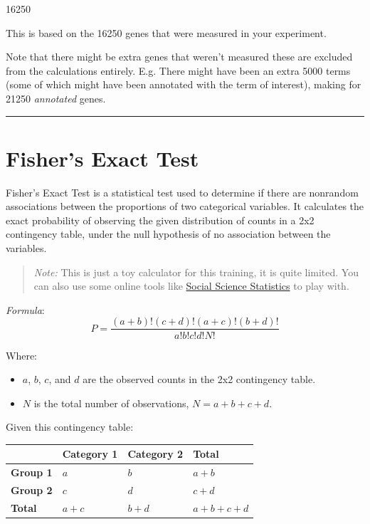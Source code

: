 \documentclass[
]{book}
\begin{document}
16250

This is based on the 16250 genes that were measured in your experiment.

Note that there might be extra genes that weren't measured these are excluded from the calculations entirely. E.g. There might have been an extra 5000 terms (some of which might have been annotated with the term of interest), making for 21250 \emph{annotated} genes.

\begin{center}\rule{0.5\linewidth}{0.5pt}\end{center}

\hypertarget{fishers-exact-test}{%
\section{\texorpdfstring{{Fisher's Exact Test}}{Fisher's Exact Test}}\label{fishers-exact-test}}

Fisher's Exact Test is a statistical test used to determine if there are nonrandom associations between the proportions of two categorical variables. It calculates the exact probability of observing the given distribution of counts in a 2x2 contingency table, under the null hypothesis of no association between the variables.

\begin{quote}
\emph{Note:} This is just a toy calculator for this training, it is quite limited. You can also use some online tools like \href{https://www.socscistatistics.com/tests/fisher/default2.aspx}{Social Science Statistics} to play with.
\end{quote}

\emph{Formula}:
\[P = \frac{(a + b)!(c + d)!(a + c)!(b + d)!}{a!b!c!d!N!}\]

Where:

\begin{itemize}
\item
  \(a\), \(b\), \(c\), and \(d\) are the observed counts in the 2x2 contingency table.
\item
  \(N\) is the total number of observations, \(N = a + b + c + d\).
\end{itemize}

Given this contingency table:

\begin{longtable}[]{@{}llll@{}}
\toprule\noalign{}
& Category 1 & Category 2 & Total \\
\midrule\noalign{}
\endhead
\bottomrule\noalign{}
\endlastfoot
\textbf{Group 1} & \(a\) & \(b\) & \(a + b\) \\
\textbf{Group 2} & \(c\) & \(d\) & \(c + d\) \\
\textbf{Total} & \(a + c\) & \(b + d\) & \(a + b + c + d\) \\
\end{longtable}
\end{document}
